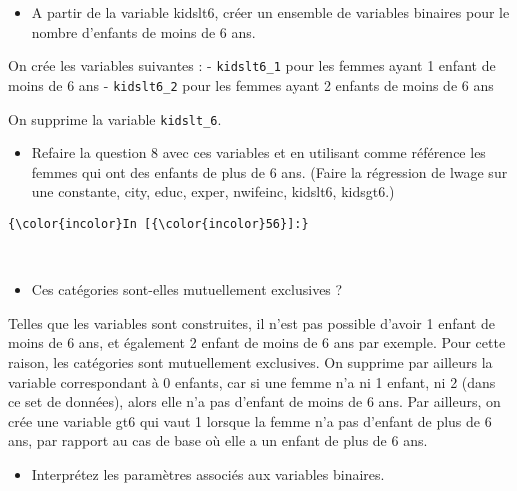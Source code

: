\documentclass[11pt]{article}
\providecommand{\tightlist}{%
      \setlength{\itemsep}{0pt}\setlength{\parskip}{0pt}}
\begin{document}
\begin{itemize}
\tightlist
\item
  A partir de la variable kidslt6, créer un ensemble de variables
  binaires pour le nombre d'enfants de moins de 6 ans. 
\end{itemize}

    On crée les variables suivantes : - \texttt{kidslt6\_1} pour les femmes
ayant 1 enfant de moins de 6 ans - \texttt{kidslt6\_2} pour les femmes
ayant 2 enfants de moins de 6 ans

On supprime la variable \texttt{kidslt\_6}.

    \begin{itemize}
\tightlist
\item
  Refaire la question 8 avec ces variables et en utilisant comme
  référence les femmes qui ont des enfants de plus de 6 ans. (Faire la
  régression de lwage sur une constante, city, educ, exper, nwifeinc,
  kidslt6, kidsgt6.)
\end{itemize}

    \begin{Verbatim}[commandchars=\\\{\}]
{\color{incolor}In [{\color{incolor}56}]:} 
\end{Verbatim}


    \begin{center}
    \end{center}
    { \hspace*{\fill} \\}
    
    \begin{itemize}
\tightlist
\item
  Ces catégories sont-elles mutuellement exclusives ?
\end{itemize}

    Telles que les variables sont construites, il n'est pas possible d'avoir
1 enfant de moins de 6 ans, et également 2 enfant de moins de 6 ans par
exemple. Pour cette raison, les catégories sont mutuellement exclusives.
On supprime par ailleurs la variable correspondant à 0 enfants, car si
une femme n'a ni 1 enfant, ni 2 (dans ce set de données), alors elle n'a
pas d'enfant de moins de 6 ans. Par ailleurs, on crée une variable gt6
qui vaut 1 lorsque la femme n'a pas d'enfant de plus de 6 ans, par
rapport au cas de base où elle a un enfant de plus de 6 ans.

    \begin{itemize}
\tightlist
\item
  Interprétez les paramètres associés aux variables binaires.
\end{itemize}
\end{document}
